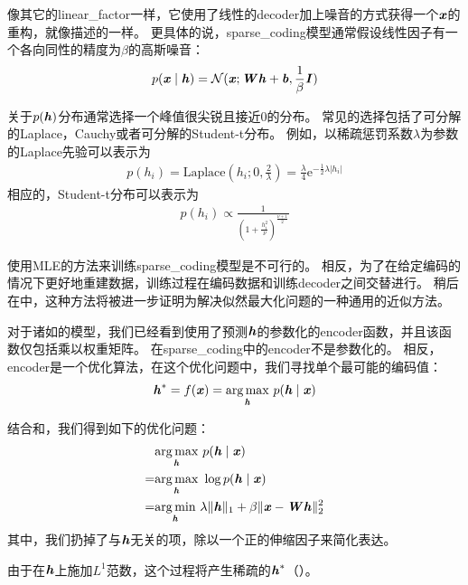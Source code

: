 像其它的\gls{linear_factor}一样，它使用了线性的\gls{decoder}加上噪音的方式获得一个$\boldsymbol{\mathit{x}}$的重构，就像描述的一样。
更具体的说，\gls{sparse_coding}模型通常假设线性因子有一个各向同性的精度为$\beta$的高斯噪音：
\begin{align}
\label{eqn:1312}
p(\boldsymbol{\mathit{x}}\mid \boldsymbol{\mathit{h}}) = \mathcal{N}
(\boldsymbol{\mathit{x}};\boldsymbol{\mathit{W}}\boldsymbol{\mathit{h}} + \boldsymbol{\mathit{b}} ,\frac{1}{\beta}\boldsymbol{\mathit{I}})
\end{align}


关于$p(\boldsymbol{\mathit{h}})$分布通常选择一个峰值很尖锐且接近0的分布\citep{Olshausen+Field-1996}。
常见的选择包括了可分解的Laplace，Cauchy或者可分解的Student-t分布。
例如，以稀疏惩罚系数$\lambda$为参数的Laplace先验可以表示为
\begin{align}
\label{eqn:1313}
p(h_i) = \text{Laplace}(h_i;0,\frac{2}{\lambda}) = \frac{\lambda}{4} \text{e}^{ -\frac{1}{2}\lambda \vert h_i\vert}
\end{align}
相应的，Student-t分布可以表示为
\begin{align}
\label{eqn:1314}
p(h_i)\propto \frac{1}{(1+\frac{h_i^2}{\nu})^{\frac{\nu+1}{2}}}
\end{align}

使用\gls{MLE}的方法来训练\gls{sparse_coding}模型是不可行的。
相反，为了在给定编码的情况下更好地重建数据，训练过程在编码数据和训练\gls{decoder}之间交替进行。
稍后在中，这种方法将被进一步证明为解决似然最大化问题的一种通用的近似方法。

对于诸如的模型，我们已经看到使用了预测$\boldsymbol{\mathit{h}}$的参数化的\gls{encoder}函数，并且该函数仅包括乘以权重矩阵。
在\gls{sparse_coding}中的\gls{encoder}不是参数化的。
相反，\gls{encoder}是一个优化算法，在这个优化问题中，我们寻找单个最可能的编码值：
\begin{align}
\label{eqn:1315}
\boldsymbol{\mathit{h}}^* = f(\boldsymbol{\mathit{x}}) = \underset{\boldsymbol{\mathit{h}}}{\arg\max}\  p(\boldsymbol{\mathit{h}}\mid\boldsymbol{\mathit{x}})
\end{align}


结合和，我们得到如下的优化问题：
\begin{align}
\label{eqn:1316}
& \underset{\boldsymbol{\mathit{h}}}{\arg\max}\  p(\boldsymbol{\mathit{h}}\mid\boldsymbol{\mathit{x}}) \\
= & \underset{\boldsymbol{\mathit{h}}}{\arg\max}\ \log  p(\boldsymbol{\mathit{h}}\mid\boldsymbol{\mathit{x}})\\
= & \underset{\boldsymbol{\mathit{h}}}{\arg\min}\ \lambda \Vert \boldsymbol{\mathit{h}}\Vert_1 + \beta  \Vert \boldsymbol{\mathit{x}} - \boldsymbol{\mathit{W}} \boldsymbol{\mathit{h}}\Vert_2^2
\end{align}
其中，我们扔掉了与$\boldsymbol{\mathit{h}}$无关的项，除以一个正的伸缩因子来简化表达。

由于在$\boldsymbol{\mathit{h}}$上施加$L^1$范数，这个过程将产生稀疏的$\boldsymbol{\mathit{h}}^*$（）。

